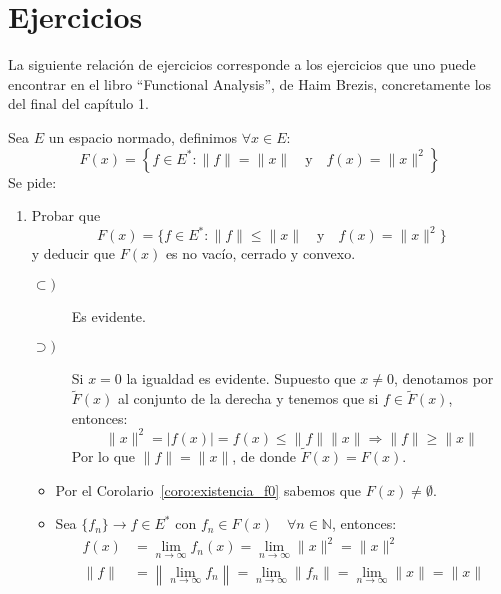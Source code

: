 \section{Ejercicios}
\noindent
La siguiente relación de ejercicios corresponde a los ejercicios que uno puede encontrar en el libro ``Functional Analysis'', de Haim Brezis, concretamente los del final del capítulo 1.

\begin{ejercicio}
    Sea $E$ un espacio normado, definimos $\forall x\in E$:
    \begin{equation*}
        F(x) = \left\{f\in E^\ast : \|f\| = \|x\| \quad \text{y}\quad f(x)=\|x\|^2\right\}
    \end{equation*}
    Se pide:
    \begin{enumerate}[label=\alph*)]
        \item Probar que
            \begin{equation*}
                F(x) = \{f\in E^\ast : \|f\|\leq \|x\| \quad \text{y}\quad f(x)=\|x\|^2\}
            \end{equation*}
            y deducir que $F(x)$ es no vacío, cerrado y convexo.
            \begin{description}
                \item [$\subset)$] Es evidente.
                \item [$\supset)$] Si $x=0$ la igualdad es evidente. Supuesto que $x\neq 0$, denotamos por $\tilde{F}(x)$ al conjunto de la derecha y tenemos que si $f\in \tilde{F}(x)$, entonces:
                    \begin{equation*}
                        \|x\|^2 = |f(x)| = f(x) \leq \|f\|\|x\| \Longrightarrow \|f\|\geq \|x\|
                    \end{equation*}
                    Por lo que $\|f\| = \|x\|$, de donde $\tilde{F}(x) = F(x)$.
            \end{description}
            \begin{itemize}
                \item Por el Corolario~\ref{coro:existencia_f0} sabemos que $F(x)\neq \emptyset $.
                \item Sea $\{f_n\}\to f\in E^\ast$ con $f_n\in F(x) \quad \forall n\in \mathbb{N}$, entonces:
                    \begin{align*}
                        f(x) &= \lim_{n\to\infty}f_n(x) = \lim_{n\to\infty}\|x\|^2 = \|x\|^2 \\
                        \|f\| &= \left\|\lim_{n\to\infty}f_n\right\| = \lim_{n\to\infty}\|f_n\| = \lim_{n\to\infty}\|x\| = \|x\|

\end{align*}
\end{itemize}
\end{enumerate}
\end{ejercicio}
